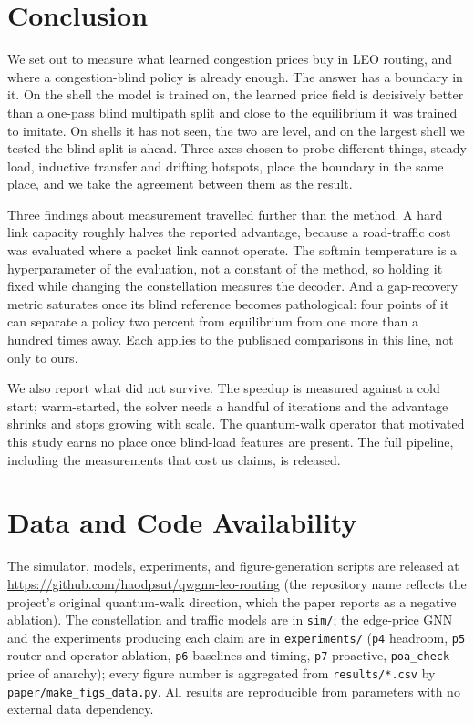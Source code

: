 \documentclass[journal]{IEEEtran}
\begin{document}
\section{Conclusion}
We set out to measure what learned congestion prices buy in LEO routing, and where a
congestion-blind policy is already enough. The answer has a boundary in it. On the shell the
model is trained on, the learned price field is decisively better than a one-pass blind
multipath split and close to the equilibrium it was trained to imitate. On shells it has not
seen, the two are level, and on the largest shell we tested the blind split is ahead. Three
axes chosen to probe different things, steady load, inductive transfer and drifting hotspots,
place the boundary in the same place, and we take the agreement between them as the result.

Three findings about measurement travelled further than the method. A hard link capacity roughly halves the reported advantage, because a road-traffic cost was evaluated where a packet link cannot operate. The softmin temperature is a hyperparameter of the evaluation, not a constant of the method, so holding it fixed while changing the constellation measures the decoder. And a gap-recovery metric saturates once its blind reference becomes pathological: four points of it can separate a policy two percent from equilibrium from one more than a hundred times away. Each applies to the published comparisons in this line, not only to ours.

We also report what did not survive. The speedup is measured against a cold start; warm-started, the solver needs a handful of iterations and the advantage shrinks and stops growing with scale. The quantum-walk operator that motivated this study earns no place once blind-load features are present. The full pipeline, including the measurements that cost us claims, is released.

\section*{Data and Code Availability}
The simulator, models, experiments, and figure-generation scripts are released at
\url{https://github.com/haodpsut/qwgnn-leo-routing} (the repository name reflects the
project's original quantum-walk direction, which the paper reports as a negative ablation). The constellation and traffic models
are in \texttt{sim/}; the edge-price GNN and the experiments producing each claim are in
\texttt{experiments/} (\texttt{p4} headroom, \texttt{p5} router and operator ablation,
\texttt{p6} baselines and timing, \texttt{p7} proactive, \texttt{poa\_check} price of
anarchy); every figure number is
aggregated from \texttt{results/*.csv} by \texttt{paper/make\_figs\_data.py}. All results
are reproducible from parameters with no external data dependency.
\end{document}
